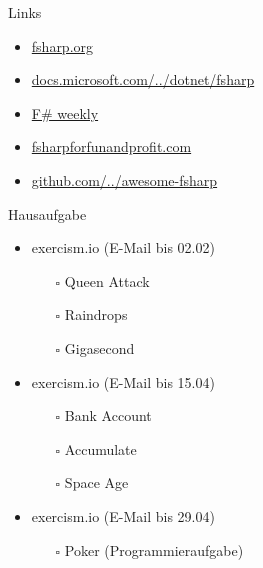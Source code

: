 \documentclass[t]{beamer}
\begin{document}
\begin{frame}[label={sec:orgc5dc745}]{Links}
\begin{itemize}
\item \href{https://fsharp.org/}{fsharp.org}
\item \href{https://docs.microsoft.com/de-de/dotnet/fsharp/}{docs.microsoft.com/../dotnet/fsharp}
\item \href{https://sergeytihon.com/}{F\# weekly}
\item \href{https://fsharpforfunandprofit.com/}{fsharpforfunandprofit.com}
\item \href{https://github.com/fsprojects/awesome-fsharp}{github.com/../awesome-fsharp}
\end{itemize}
\end{frame}

\begin{frame}[label={sec:orgf5d540c}]{Hausaufgabe}
\begin{itemize}
\item exercism.io (E-Mail bis 02.02)
\begin{itemize}
\item[{$\square$}] Queen Attack
\item[{$\square$}] Raindrops
\item[{$\square$}] Gigasecond
\end{itemize}
\item exercism.io (E-Mail bis 15.04)
\begin{itemize}
\item[{$\square$}] Bank Account
\item[{$\square$}] Accumulate
\item[{$\square$}] Space Age
\end{itemize}
\item exercism.io (E-Mail bis 29.04)
\begin{itemize}
\item[{$\square$}] Poker (Programmieraufgabe)
\end{itemize}
\end{itemize}
\end{frame}
\end{document}
